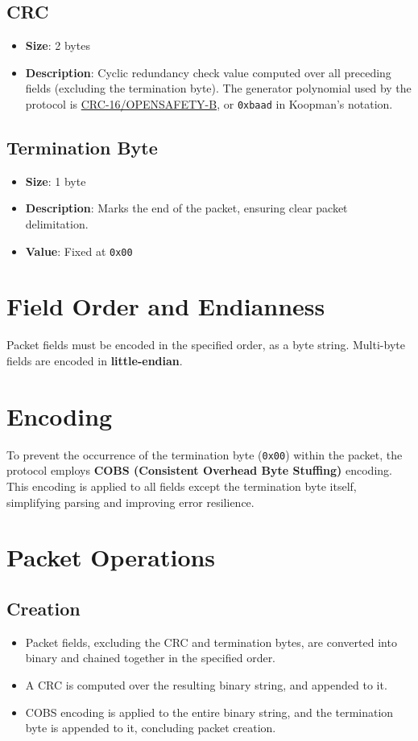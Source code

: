 \documentclass[a4paper,11pt,english]{article}
\begin{document}
\subsection{CRC}
\begin{itemize}
  \item \textbf{Size}: 2 bytes
  \item \textbf{Description}: Cyclic redundancy check value computed over all preceding fields (excluding the termination byte). The generator polynomial used by the protocol is \href{https://reveng.sourceforge.io/crc-catalogue/all.htm#crc.cat.crc-16-opensafety-b}{CRC-16/OPENSAFETY-B}, or \texttt{0xbaad} in Koopman's notation.
\end{itemize}

\subsection{Termination Byte}
\begin{itemize}
  \item \textbf{Size}: 1 byte
  \item \textbf{Description}: Marks the end of the packet, ensuring clear packet delimitation.
  \item \textbf{Value}: Fixed at \texttt{0x00}
\end{itemize}

\section{Field Order and Endianness}

Packet fields must be encoded in the specified order, as a byte string. Multi-byte fields are encoded in \textbf{little-endian}.

\section{Encoding}

To prevent the occurrence of the termination byte (\texttt{0x00}) within the packet, the protocol employs \textbf{COBS (Consistent Overhead Byte Stuffing)} encoding. This encoding is applied to all fields except the termination byte itself, simplifying parsing and improving error resilience.

\section{Packet Operations}

\subsection{Creation}
\begin{itemize}
  \item Packet fields, excluding the CRC and termination bytes, are converted into binary and chained together in the specified order.
  \item A CRC is computed over the resulting binary string, and appended to it.
  \item COBS encoding is applied to the entire binary string, and the termination byte is appended to it, concluding packet creation.
\end{itemize}
\end{document}
